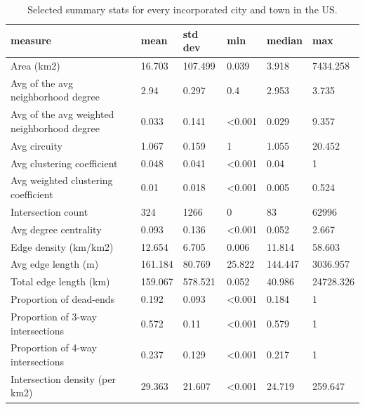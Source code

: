 \documentclass{article}
\begin{document}
\begin{table}
\centering
\caption{Selected summary stats for every incorporated city and town in the US.}
\label{table03}
\begin{tabular}{llllll}
	\toprule
	measure                                     & mean    & std dev & min            & median         & max       \\
	\midrule
	Area (km2)                                  & 16.703  & 107.499 & 0.039          & 3.918          & 7434.258  \\
	Avg of the avg neighborhood degree          & 2.94    & 0.297   & 0.4            & 2.953          & 3.735     \\
	Avg of the avg weighted neighborhood degree & 0.033   & 0.141   & \textless0.001 & 0.029          & 9.357     \\
	Avg circuity                                & 1.067   & 0.159   & 1              & 1.055          & 20.452    \\
	Avg clustering coefficient                  & 0.048   & 0.041   & \textless0.001 & 0.04           & 1         \\
	Avg weighted clustering coefficient         & 0.01    & 0.018   & \textless0.001 & 0.005          & 0.524     \\
	Intersection count                          & 324     & 1266    & 0              & 83             & 62996     \\
	Avg degree centrality                       & 0.093   & 0.136   & \textless0.001 & 0.052          & 2.667     \\
	Edge density (km/km2)                       & 12.654  & 6.705   & 0.006          & 11.814         & 58.603    \\
	Avg edge length (m)                         & 161.184 & 80.769  & 25.822         & 144.447        & 3036.957  \\
	Total edge length (km)                      & 159.067 & 578.521 & 0.052          & 40.986         & 24728.326 \\
	Proportion of dead-ends                     & 0.192   & 0.093   & \textless0.001 & 0.184          & 1         \\
	Proportion of 3-way intersections           & 0.572   & 0.11    & \textless0.001 & 0.579          & 1         \\
	Proportion of 4-way intersections           & 0.237   & 0.129   & \textless0.001 & 0.217          & 1         \\
	Intersection density (per km2)              & 29.363  & 21.607  & \textless0.001 & 24.719         & 259.647   \\

\end{tabular}
\end{table}
\end{document}
